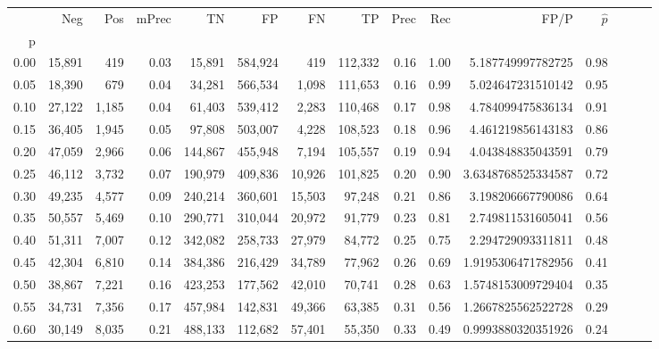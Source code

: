\begin{tabular}{rrrrrrrrrrrrrrr}
\toprule
{} &     Neg &    Pos & mPrec &       TN &       FP &       FN &       TP &  Prec &   Rec &                 FP/P & $\hat{p}$ \\
p    &         &        &       &          &          &          &          &       &       &                      &           \\
\midrule
0.00 &  15,891 &    419 &  0.03 &   15,891 &  584,924 &      419 &  112,332 &  0.16 &  1.00 &    5.187749997782725 &      0.98 \\
0.05 &  18,390 &    679 &  0.04 &   34,281 &  566,534 &    1,098 &  111,653 &  0.16 &  0.99 &    5.024647231510142 &      0.95 \\
0.10 &  27,122 &  1,185 &  0.04 &   61,403 &  539,412 &    2,283 &  110,468 &  0.17 &  0.98 &    4.784099475836134 &      0.91 \\
0.15 &  36,405 &  1,945 &  0.05 &   97,808 &  503,007 &    4,228 &  108,523 &  0.18 &  0.96 &    4.461219856143183 &      0.86 \\
0.20 &  47,059 &  2,966 &  0.06 &  144,867 &  455,948 &    7,194 &  105,557 &  0.19 &  0.94 &    4.043848835043591 &      0.79 \\
0.25 &  46,112 &  3,732 &  0.07 &  190,979 &  409,836 &   10,926 &  101,825 &  0.20 &  0.90 &   3.6348768525334587 &      0.72 \\
0.30 &  49,235 &  4,577 &  0.09 &  240,214 &  360,601 &   15,503 &   97,248 &  0.21 &  0.86 &    3.198206667790086 &      0.64 \\
0.35 &  50,557 &  5,469 &  0.10 &  290,771 &  310,044 &   20,972 &   91,779 &  0.23 &  0.81 &    2.749811531605041 &      0.56 \\
0.40 &  51,311 &  7,007 &  0.12 &  342,082 &  258,733 &   27,979 &   84,772 &  0.25 &  0.75 &    2.294729093311811 &      0.48 \\
0.45 &  42,304 &  6,810 &  0.14 &  384,386 &  216,429 &   34,789 &   77,962 &  0.26 &  0.69 &   1.9195306471782956 &      0.41 \\
0.50 &  38,867 &  7,221 &  0.16 &  423,253 &  177,562 &   42,010 &   70,741 &  0.28 &  0.63 &   1.5748153009729404 &      0.35 \\
0.55 &  34,731 &  7,356 &  0.17 &  457,984 &  142,831 &   49,366 &   63,385 &  0.31 &  0.56 &   1.2667825562522728 &      0.29 \\
0.60 &  30,149 &  8,035 &  0.21 &  488,133 &  112,682 &   57,401 &   55,350 &  0.33 &  0.49 &   0.9993880320351926 &      0.24 \\

\end{tabular}
